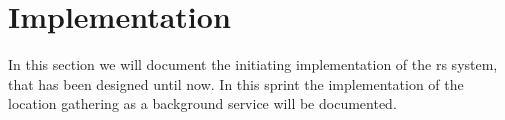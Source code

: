 \section{Implementation}
In this section we will document the initiating implementation of the \gls{rs} system, that has been designed until now. 
In this sprint the implementation of the location gathering as a background service will be documented. 





